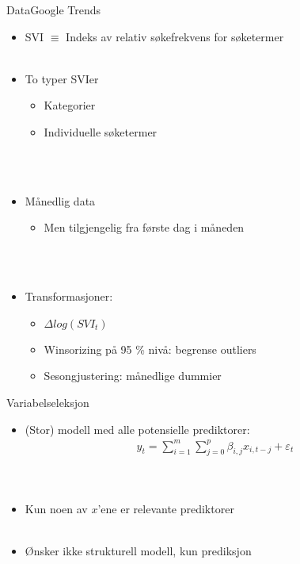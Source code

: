 \documentclass{beamer}
\begin{document}
\begin{frame}{Data}{Google Trends}
  	\begin{itemize}
  		\item SVI $\equiv$ Indeks av relativ søkefrekvens for søketermer \\~\\
  		\item To typer SVIer
  			\begin{itemize}
  				\item Kategorier
  				\item Individuelle søketermer
  			\end{itemize} \ \\~\\
  		\item Månedlig data
  			\begin{itemize}
  				\item Men tilgjengelig fra første dag i måneden
  			\end{itemize}  \ \\~\\
  		\item Transformasjoner:
  			\begin{itemize}
  				\item $\Delta log(SVI_t)$
  				\item Winsorizing på 95 \% nivå: begrense outliers
  				\item Sesongjustering: månedlige dummier
  			\end{itemize}
  	\end{itemize}
\end{frame}



\begin{frame}{Variabelseleksjon}
	\begin{itemize}
		\item (Stor) modell med alle potensielle prediktorer:
			\begin{align*}
				y_{t} = \sum_{i = 1}^m \sum_{j = 0}^p \beta_{i, j} x_{i, t - j} + 	\varepsilon_{t}
			\end{align*} \ \\~\\
		\item Kun noen av $x$'ene er relevante prediktorer \ \\~\\
		\item Ønsker ikke strukturell modell, kun prediksjon
	\end{itemize}
\end{frame}
\end{document}
